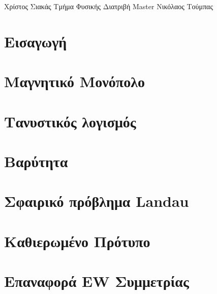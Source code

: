 \documentclass{tstextbook}
\begin{document}
\sloppy %
       {Χρίστος Σιακάς}
       {Τμήμα Φυσικής}
       {Διατριβή Master}
       {Νικόλαος Τούμπας}


\chapter{Εισαγωγή}

\chapter{Μαγνητικό Μονόπολο}


\chapter{Τανυστικός λογισμός}\label{chaptertensorcal}

\chapter{Βαρύτητα}

\chapter{Σφαιρικό πρόβλημα Landau}

\chapter{Καθιερωμένο Πρότυπο}

\chapter{Επαναφορά EW Συμμετρίας}\label{chapter symmetry restoration}

\end{document}
